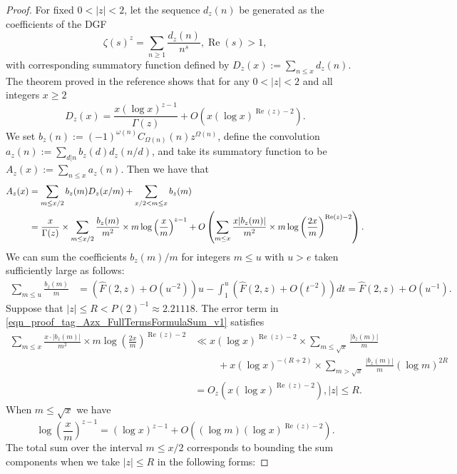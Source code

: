 \documentclass[11pt,reqno,a4letter]{article}
\numberwithin{figure}{section}
\numberwithin{table}{section}
\theoremstyle{plain}
\numberwithin{theorem}{section}
\theoremstyle{definition}
\renewcommand{\Re}{\operatorname{Re}}
\begin{document}
\begin{proof}
For fixed $0 < |z| < 2$, let the sequence $d_z(n)$ be generated as the coefficients of the DGF 
$$\zeta(s)^{z} = \sum_{n \geq 1} \frac{d_z(n)}{n^s}, \Re(s) > 1,$$ with corresponding 
summatory function defined by $D_z(x) := \sum_{n \leq x} d_z(n)$. 
The theorem proved in the reference 
\cite[Thm.\ 7.17; \S 7.4]{MV} shows that for any $0 < |z| < 2$ 
and all integers $x \geq 2$ 
\[
D_z(x) = \frac{x (\log x)^{z-1}}{\Gamma(z)} + O\left(x (\log x)^{\Re(z)-2}\right). 
\]
We set 
$b_z(n) := (-1)^{\omega(n)} C_{\Omega(n)}(n) z^{\Omega(n)}$, define the convolution 
$a_z(n) := \sum_{d|n} b_z(d) d_z(n/d)$, and take its summatory function to be 
$A_z(x) := \sum_{n \leq x} a_z(n)$. 
Then we have that 
\begin{align} 
\notag 
A_z(x) & = \sum_{m \leq x/2} b_z(m) D_z(x/m) + \sum_{x/2 < m \leq x} b_z(m) \\ 
\label{eqn_proof_tag_Azx_FullTermsFormulaSum_v1} 
     & = \frac{x}{\Gamma(z)} \times \sum_{m \leq x/2} 
     \frac{b_z(m)}{m^2} \times m \log\left(\frac{x}{m}\right)^{z-1} + 
     O\left(\sum_{m \leq x} \frac{x |b_z(m)|}{m^2} \times m 
     \log\left(\frac{2x}{m}\right)^{\Re(z) - 2}\right). 
\end{align} 
We can sum the coefficients $b_z(m) / m$ 
for integers $m \leq u$ with $u > e$ taken sufficiently large as follows: 
\begin{align*} 
\sum_{m \leq u} \frac{b_z(m)}{m} & = \left(\widehat{F}(2, z) + O(u^{-2})\right) u - \int_1^{u} 
     \left(\widehat{F}(2, z) + O(t^{-2})\right) dt 
     = \widehat{F}(2, z) + O(u^{-1}). 
\end{align*} 
Suppose that $|z| \leq R < P(2)^{-1} \approx 2.21118$. 
The error term in \eqref{eqn_proof_tag_Azx_FullTermsFormulaSum_v1} satisfies 
\begin{align*} 
\sum_{m \leq x} \frac{x \cdot |b_z(m)|}{m^2} \times m 
     \log\left(\frac{2x}{m}\right)^{\Re(z) - 2} & \ll 
     x (\log x)^{\Re(z) - 2} \times \sum_{m \leq \sqrt{x}} \frac{|b_z(m)|}{m} \\ 
     & \phantom{\ll x\ } + 
     x (\log x)^{-(R+2)} \times \sum_{m > \sqrt{x}} \frac{|b_z(m)|}{m} (\log m)^{2R} \\ 
     & = O_z\left(x (\log x)^{\Re(z) - 2}\right), |z| \leq R. 
\end{align*} 
When $m \leq \sqrt{x}$ we have 
\[
\log\left(\frac{x}{m}\right)^{z-1} = (\log x)^{z-1} + 
     O\left((\log m) (\log x)^{\Re(z) - 2}\right). 
\]
The total sum over the interval $m \leq x/2$ corresponds to bounding the 
sum components when we take $|z| \leq R$ in the following forms: 

\end{proof}
\end{document}
